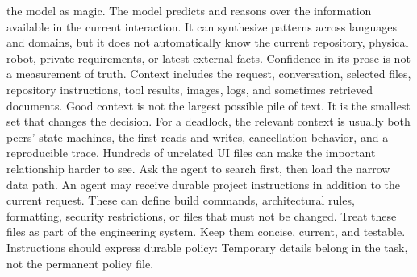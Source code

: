{}the model as magic.\markdownRendererInterblockSeparator
{}\markdownRendererSectionBegin
{}\markdownRendererInterblockSeparator
{}The model predicts and reasons over the information available in the current\markdownRendererSoftLineBreak
{}interaction. It can synthesize patterns across languages and domains, but it\markdownRendererSoftLineBreak
{}does not automatically know the current repository, physical robot, private\markdownRendererSoftLineBreak
{}requirements, or latest external facts. Confidence in its prose is not a\markdownRendererSoftLineBreak
{}measurement of truth.\markdownRendererInterblockSeparator
{}
\markdownRendererSectionEnd \markdownRendererSectionBegin
{}\markdownRendererInterblockSeparator
{}Context includes the request, conversation, selected files, repository\markdownRendererSoftLineBreak
{}instructions, tool results, images, logs, and sometimes retrieved documents.\markdownRendererSoftLineBreak
{}Good context is not the largest possible pile of text. It is the smallest set\markdownRendererSoftLineBreak
{}that changes the decision.\markdownRendererParagraphSeparator
{}For a deadlock, the relevant context is usually both peers' state machines,\markdownRendererSoftLineBreak
{}the first reads and writes, cancellation behavior, and a reproducible trace.\markdownRendererSoftLineBreak
{}Hundreds of unrelated UI files can make the important relationship harder to\markdownRendererSoftLineBreak
{}see. Ask the agent to search first, then load the narrow data path.\markdownRendererInterblockSeparator
{}
\markdownRendererSectionEnd \markdownRendererSectionBegin
{}\markdownRendererInterblockSeparator
{}An agent may receive durable project instructions in addition to the current\markdownRendererSoftLineBreak
{}request. These can define build commands, architectural rules, formatting,\markdownRendererSoftLineBreak
{}security restrictions, or files that must not be changed. Treat these files as\markdownRendererSoftLineBreak
{}part of the engineering system. Keep them concise, current, and testable.\markdownRendererParagraphSeparator
{}Instructions should express durable policy:\markdownRendererInterblockSeparator
{}\markdownRendererInterblockSeparator
{}Temporary details belong in the task, not the permanent policy file.\markdownRendererInterblockSeparator
